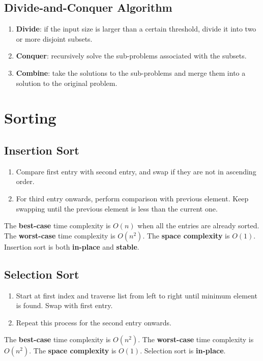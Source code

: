 \documentclass[12pt]{extarticle}
\newcommand{\N}{\newline\newline}
\begin{document}
	\subsection{Divide-and-Conquer Algorithm}
	\begin{enumerate}
		\item
		\textbf{Divide}: if the input size is larger than a certain threshold, divide it into two or more disjoint subsets.
		\item
		\textbf{Conquer}: recursively solve the sub-problems associated with the subsets.
		\item 
		\textbf{Combine}: take the solutions to the sub-problems and merge them into a solution to the original problem.
	\end{enumerate}
	\bigskip
	\section{Sorting}
	\subsection{Insertion Sort}
	\begin{enumerate}
		\item
		Compare first entry with second entry, and swap if they are not in ascending order.
		\item
		For third entry onwards, perform comparison with previous element. Keep swapping until the previous element is less than the current one.
	\end{enumerate}
	The \textbf{best-case} time complexity is $O(n)$ when all the entries are already sorted.\N
	The \textbf{worst-case} time complexity is $O(n^2)$.\N
	The \textbf{space complexity} is $O(1)$.\N
	Insertion sort is both \textbf{in-place} and \textbf{stable}.
	\subsection{Selection Sort}
	\begin{enumerate}
		\item
		Start at first index and traverse list from left to right until minimum element is found. Swap with first entry.
		\item
		Repeat this process for the second entry onwards.
	\end{enumerate}
	The \textbf{best-case} time complexity is $O(n^2)$.\N
	The \textbf{worst-case} time complexity is $O(n^2)$.\N
	The \textbf{space complexity} is $O(1)$.\N
	Selection sort is \textbf{in-place}.
\end{document}
